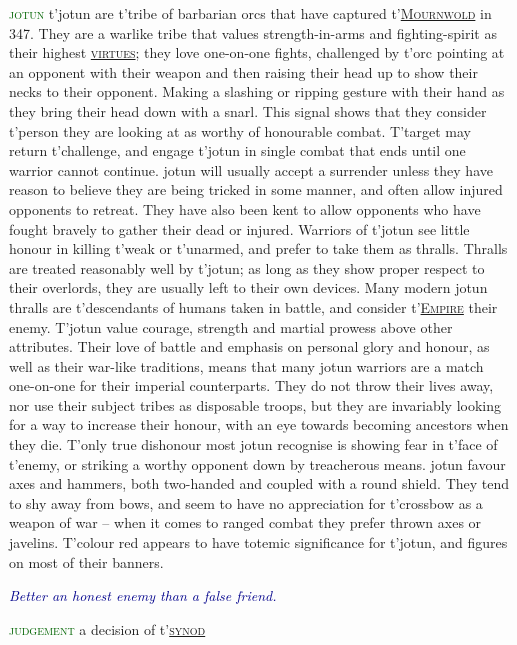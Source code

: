 \documentclass[twoside,11pt,b5paper,twocolumn]{scrbook}
\newcommand{\estcab}[1]{\textsc{\textcolor{marron}{#1}}}
\newcommand{\keyword}[1]{\textcolor{darkgreen}{#1}}
\renewcommand{\paragraph}[1]{\par\noindent\markboth{#1}{#1}\estcab{\keyword{#1}}\label{#1} }
\newcommand{\see}[1]{{\estcab{\hyperref[#1]{#1}}}}
\newcommand{\proverb}[1]{\par \textcolor{darkblue}{\itshape #1}}
\begin{document}
\paragraph{jotun} t'jotun are t'tribe of barbarian orcs that have captured t'\see{Mournwold} in 347. They are a warlike tribe that values strength-in-arms and fighting-spirit as their highest \see{virtues}; they love one-on-one fights, challenged by t'orc pointing at an opponent with their weapon and then raising their head up to show their necks to their opponent. Making a slashing or ripping gesture with their hand as they bring their head down with a snarl. This signal shows that they consider t'person they are looking at as worthy of honourable combat. T'target may return t'challenge, and engage t'jotun in single combat that ends until one warrior cannot continue. jotun will usually accept a surrender unless they have reason to believe they are being tricked in some manner, and often allow injured opponents to retreat. They have also been kent to allow opponents who have fought bravely to gather their dead or injured. Warriors of t'jotun see little honour in killing t'weak or t'unarmed, and prefer to take them as thralls. Thralls are treated reasonably well by t'jotun; as long as they show proper respect to their overlords, they are usually left to their own devices. Many modern jotun thralls are t'descendants of humans taken in battle, and consider t'\see{Empire} their enemy. T'jotun value courage, strength and martial prowess above other attributes. Their love of battle and emphasis on personal glory and honour, as well as their war-like traditions, means that many jotun warriors are a match one-on-one for their imperial counterparts. They do not throw their lives away, nor use their subject tribes as disposable troops, but they are invariably looking for a way to increase their honour, with an eye towards becoming ancestors when they die. T'only true dishonour most jotun recognise is showing fear in t'face of t'enemy, or striking a worthy opponent down by treacherous means. jotun favour axes and hammers, both two-handed and coupled with a round shield. They tend to shy away from bows, and seem to have no appreciation for t'crossbow as a weapon of war – when it comes to ranged combat they prefer thrown axes or javelins. T'colour red appears to have totemic significance for t'jotun, and figures on most of their banners. \proverb{Better an honest enemy than a false friend.}
\paragraph{judgement} a decision of t'\see{synod}
\end{document}
